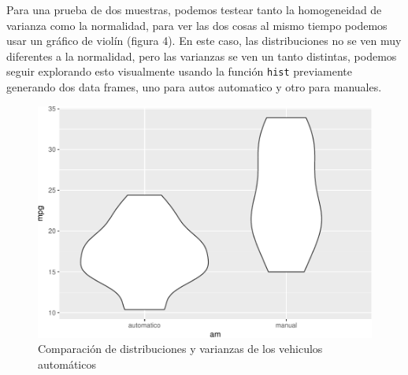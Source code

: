 \documentclass[]{article}
\newenvironment{Shaded}{\begin{snugshade}}{\end{snugshade}}
\newcommand{\KeywordTok}[1]{\textcolor[rgb]{0.13,0.29,0.53}{\textbf{#1}}}
\newcommand{\DataTypeTok}[1]{\textcolor[rgb]{0.13,0.29,0.53}{#1}}
\newcommand{\DecValTok}[1]{\textcolor[rgb]{0.00,0.00,0.81}{#1}}
\newcommand{\StringTok}[1]{\textcolor[rgb]{0.31,0.60,0.02}{#1}}
\newcommand{\OperatorTok}[1]{\textcolor[rgb]{0.81,0.36,0.00}{\textbf{#1}}}
\newcommand{\NormalTok}[1]{#1}
\begin{document}
Para una prueba de dos muestras, podemos testear tanto la homogeneidad
de varianza como la normalidad, para ver las dos cosas al mismo tiempo
podemos usar un gráfico de violín (figura 4). En este caso, las
distribuciones no se ven muy diferentes a la normalidad, pero las
varianzas se ven un tanto distintas, podemos seguir explorando esto
visualmente usando la función \texttt{hist} previamente generando dos
data frames, uno para autos automatico y otro para manuales.

\begin{Shaded}
\end{Shaded}

\begin{figure}
\centering
\includegraphics{Guia5_files/figure-latex/unnamed-chunk-8-1.pdf}
\caption{Comparación de distribuciones y varianzas de los vehiculos
automáticos}
\end{figure}
\end{document}

